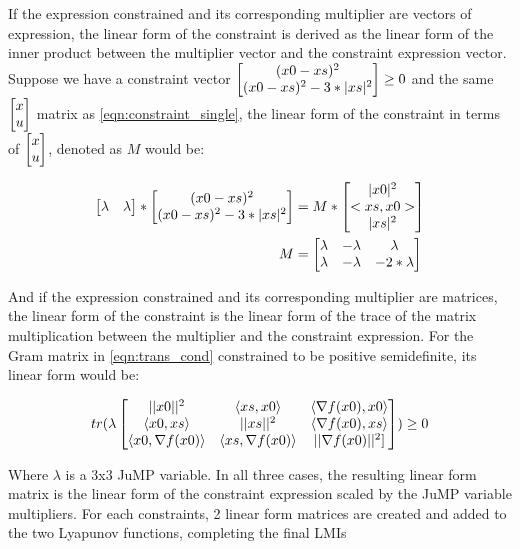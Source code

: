 If the expression constrained and its corresponding multiplier are vectors of expression, the linear form of the constraint is derived as the linear form of the inner product between the multiplier vector and the constraint expression vector. Suppose we have a constraint vector $\begin{bmatrix}(x0-xs)^2 \\ (x0-xs)^2-3*|xs|^2\end{bmatrix} \geq 0$ and the same $\begin{bmatrix}x\\ u\end{bmatrix}$ matrix as \ref{eqn:constraint_single}, the linear form of the constraint in terms of $\begin{bmatrix}x\\ u\end{bmatrix}$, denoted as $M$ would be:

\begin{subequations} \label{eqn:constraint_vector}
	\begin{align}
    \begin{bmatrix}\lambda  & \lambda \end{bmatrix} * \begin{bmatrix}(x0 - xs)^2 \\ (x0 - xs)^2-3*|xs|^2\end{bmatrix} &= M * \begin{bmatrix}|x0|^2\\ <xs, x0>\\ |xs|^2\end{bmatrix} \label{eq_cons_vector1}       \\
	M &= \begin{bmatrix}\lambda & -\lambda & \lambda \\ \lambda & -\lambda & -2*\lambda\end{bmatrix} \label{eq_cons_vector2}
	\end{align}
\end{subequations}

And if the expression constrained and its corresponding multiplier are matrices, the linear form of the constraint is the linear form of the trace of the matrix multiplication between the multiplier and the constraint expression. For the Gram matrix in \ref{eqn:trans_cond} constrained to be positive semidefinite, its linear form would be:

\begin{equation} \label{eqn:trans_cond}
	tr(\lambda \begin{bmatrix}||x0||^2 & \langle xs, x0 \rangle & \langle \nabla f(x0), x0 \rangle \\ \langle x0, xs \rangle & ||xs||^2 & \langle \nabla f(x0), xs \rangle \\ \langle x0, \nabla f(x0) \rangle & \langle xs, \nabla f(x0) \rangle & ||\nabla f(x0)||^2]\end{bmatrix}) \geq 0	
\end{equation}

Where $\lambda $ is a 3x3 JuMP variable. In all three cases, the resulting linear form matrix is the linear form of the constraint expression scaled by the JuMP variable multipliers. For each constraints, 2 linear form matrices are created and added to the two Lyapunov functions, completing the final LMIs

